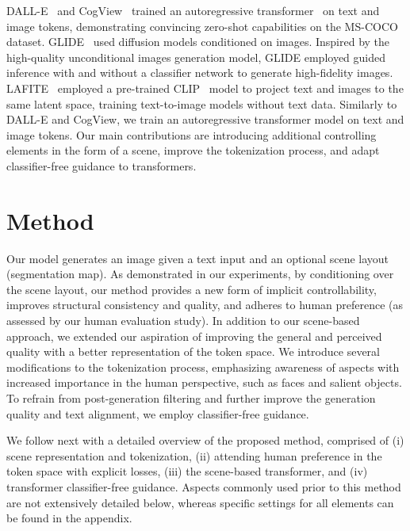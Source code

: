 \documentclass[final]{cvpr}
\begin{document}
DALL-E~\cite{ramesh2021zero} and CogView~\cite{ding2021cogview} trained an autoregressive transformer~\cite{vaswani2017attention} on text and image tokens, demonstrating convincing zero-shot capabilities on the MS-COCO dataset. GLIDE~\cite{nichol2021glide} used diffusion models conditioned on images. Inspired by the high-quality unconditional images generation model, GLIDE employed guided inference with and without a classifier network to generate high-fidelity images. LAFITE~\cite{zhou2021lafite} employed a pre-trained CLIP~\cite{radford2021learning} model to project text and images to the same latent space, training text-to-image models without text data. Similarly to DALL-E and CogView, we train an autoregressive transformer model on text and image tokens. Our main contributions are introducing additional controlling elements in the form of a scene, improve the tokenization process, and adapt classifier-free guidance to transformers.

\section{Method}
Our model generates an image given a text input and an optional scene layout (segmentation map). As demonstrated in our experiments, by conditioning over the scene layout, our method provides a new form of implicit controllability, improves structural consistency and quality, and adheres to human preference (as assessed by our human evaluation study).
In addition to our scene-based approach, we extended our aspiration of improving the general and perceived quality with a better representation of the token space. We introduce several modifications to the tokenization process, emphasizing awareness of aspects with increased importance in the human perspective, such as faces and salient objects. To refrain from post-generation filtering and further improve the generation quality and text alignment, we employ classifier-free guidance.

We follow next with a detailed overview of the proposed method, comprised of (i) scene representation and tokenization, (ii) attending human preference in the token space with explicit losses, (iii) the scene-based transformer, and (iv) transformer classifier-free guidance. Aspects commonly used prior to this method are not extensively detailed below, whereas specific settings for all elements can be found in the appendix.
\end{document}
